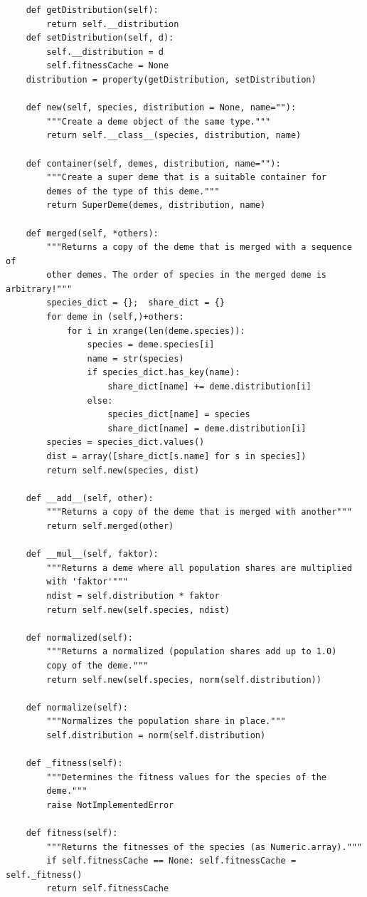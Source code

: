 \begin{scriptsize}
\begin{verbatim}
    def getDistribution(self):
        return self.__distribution
    def setDistribution(self, d):
        self.__distribution = d
        self.fitnessCache = None
    distribution = property(getDistribution, setDistribution)

    def new(self, species, distribution = None, name=""):
        """Create a deme object of the same type."""
        return self.__class__(species, distribution, name)

    def container(self, demes, distribution, name=""):
        """Create a super deme that is a suitable container for
        demes of the type of this deme."""
        return SuperDeme(demes, distribution, name)

    def merged(self, *others):
        """Returns a copy of the deme that is merged with a sequence of
        other demes. The order of species in the merged deme is arbitrary!"""
        species_dict = {};  share_dict = {}
        for deme in (self,)+others:
            for i in xrange(len(deme.species)):
                species = deme.species[i]
                name = str(species)
                if species_dict.has_key(name):
                    share_dict[name] += deme.distribution[i]
                else:
                    species_dict[name] = species
                    share_dict[name] = deme.distribution[i]
        species = species_dict.values()
        dist = array([share_dict[s.name] for s in species])
        return self.new(species, dist)

    def __add__(self, other):
        """Returns a copy of the deme that is merged with another"""
        return self.merged(other)

    def __mul__(self, faktor):
        """Returns a deme where all population shares are multiplied
        with 'faktor'"""
        ndist = self.distribution * faktor
        return self.new(self.species, ndist)

    def normalized(self):
        """Returns a normalized (population shares add up to 1.0)
        copy of the deme."""
        return self.new(self.species, norm(self.distribution))

    def normalize(self):
        """Normalizes the population share in place."""
        self.distribution = norm(self.distribution)

    def _fitness(self):
        """Determines the fitness values for the species of the
        deme."""
        raise NotImplementedError

    def fitness(self):
        """Returns the fitnesses of the species (as Numeric.array)."""
        if self.fitnessCache == None: self.fitnessCache = self._fitness()
        return self.fitnessCache


\end{verbatim}
\end{scriptsize}
